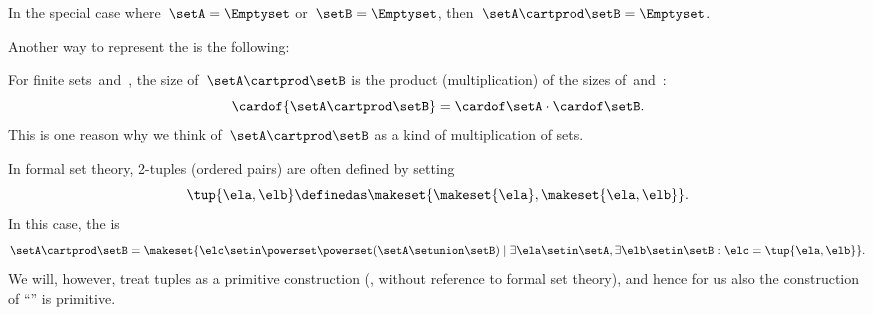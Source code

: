 In the special case where~$\setA = \Emptyset$ or~$\setB = \Emptyset$, then~$\setA \cartprod \setB = \Emptyset$.

Another way to represent the  is the following:
%

%

\begin{remark}
    For finite sets~\setA and~\setB, the size of~$\setA \cartprod \setB$ is the product (multiplication) of the sizes of~\setA and~\setB:
    \begin{equation}
        \cardof{\setA \cartprod \setB} = \cardof\setA \cdot \cardof \setB.
    \end{equation}
    This is one reason why we think of~$\setA \cartprod \setB$ as a kind of multiplication of sets.
\end{remark}

\begin{remark}
    \label{rem:formal-cartesian}
    In formal set theory, 2-tuples (ordered pairs) are often defined by setting
    \begin{equation}
        \label{eq:ordered-pair}
        \tup{\ela, \elb} \definedas \makeset{ \makeset{\ela }, \makeset{ \ela, \elb } }.
    \end{equation}
    In this case, the  is
    \begin{equation}
        \setA \cartprod \setB = \makeset{ \elc \setin\powerset \powerset (\setA \setunion \setB) \mid \exists \ela \setin\setA, \exists \elb \setin\setB : \elc = \tup{\ela, \elb} }.
    \end{equation}
    We will, however, treat tuples as a primitive construction (\ie, without reference to formal set theory), and hence for us also the construction of ``'' is primitive.
\end{remark}

